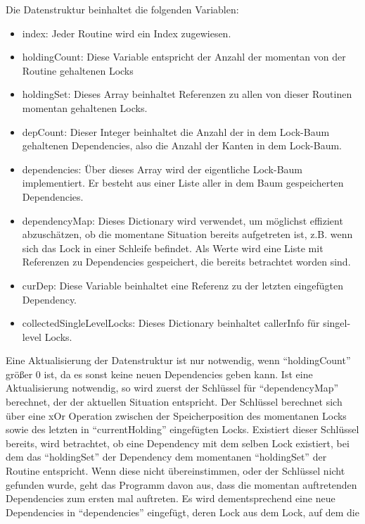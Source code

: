 Die Datenstruktur beinhaltet die folgenden Variablen:
\begin{itemize}
    \item index: Jeder Routine wird ein Index zugewiesen.
    \item holdingCount: Diese Variable entspricht der Anzahl der momentan von der 
        Routine gehaltenen Locks
    \item holdingSet: Dieses Array beinhaltet Referenzen zu allen von dieser 
        Routinen momentan gehaltenen Locks.
    \item depCount: Dieser Integer beinhaltet die Anzahl der in dem Lock-Baum 
        gehaltenen Dependencies, also die Anzahl der Kanten in dem Lock-Baum.
    \item dependencies: Über dieses Array wird der eigentliche Lock-Baum 
        implementiert. Er besteht aus einer Liste aller in dem Baum gespeicherten 
        Dependencies.
    \item dependencyMap: Dieses Dictionary wird verwendet, um möglichst 
        effizient abzuschätzen, ob die momentane Situation bereits aufgetreten 
        ist, z.B. wenn sich das Lock in einer Schleife befindet. Als Werte wird
        eine Liste mit Referenzen zu Dependencies gespeichert, die bereits 
        betrachtet worden sind.
    \item curDep: Diese Variable beinhaltet eine Referenz zu der letzten 
        eingefügten Dependency.
    \item collectedSingleLevelLocks: Dieses Dictionary beinhaltet callerInfo für 
        singel-level Locks.
\end{itemize}
Eine Aktualisierung der Datenstruktur ist nur notwendig, wenn ``holdingCount'' 
größer 0 ist, da es sonst keine neuen Dependencies geben kann. Ist eine 
Aktualisierung notwendig, so wird zuerst der Schlüssel für ``dependencyMap''
berechnet, der der aktuellen Situation entspricht. Der Schlüssel berechnet sich 
über eine xOr Operation zwischen der Speicherposition des momentanen Locks 
sowie des letzten in ``currentHolding'' eingefügten Locks. Existiert dieser 
Schlüssel bereits, wird betrachtet, ob eine Dependency mit dem selben Lock
existiert, bei dem das ``holdingSet'' der Dependency dem momentanen ``holdingSet''
der Routine entspricht. Wenn diese nicht übereinstimmen, oder der Schlüssel
nicht gefunden wurde, geht das Programm davon aus, dass die momentan auftretenden
Dependencies zum ersten mal auftreten. Es wird dementsprechend eine neue
Dependencies in ``dependencies'' eingefügt, deren Lock aus dem Lock, auf dem die
